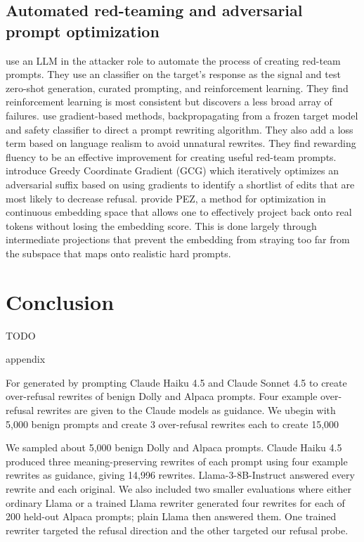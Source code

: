 \documentclass{article}
\begin{document}
\subsection{Automated red-teaming and adversarial prompt optimization}
  \citet{perez2022redteaming} use an LLM in the attacker role to automate the process of creating red-team prompts. They use an classifier on the target's response as the signal and test zero-shot generation, curated prompting, and reinforcement learning. They find reinforcement learning is most consistent but discovers a less broad array of failures. \citet{wichers2024gradient} use gradient-based methods, backpropagating from a frozen target model and safety classifier to direct a prompt rewriting algorithm. They also add a loss term based on language realism to avoid unnatural rewrites. They find rewarding fluency to be an effective improvement for creating useful red-team prompts. \citet{zou2023universal} introduce Greedy Coordinate Gradient (GCG) which iteratively optimizes an adversarial suffix based on using gradients to identify a shortlist of edits that are most likely to decrease refusal. \citet{wen2023hard} provide PEZ, a method for optimization in continuous embedding space that allows one to effectively project back onto real tokens without losing the embedding score. This is done largely through intermediate projections that prevent the embedding from straying too far from the subspace that maps onto realistic hard prompts.
  
\section{Conclusion}

TODO


appendix

For  generated by prompting Claude Haiku 4.5 and Claude Sonnet 4.5 to create over-refusal rewrites of benign Dolly and Alpaca prompts. Four example over-refusal rewrites are given to the Claude models as guidance. We ubegin with 5,000 benign prompts and create 3 over-refusal rewrites each to create 15,000


We sampled about 5,000 benign Dolly and Alpaca prompts. Claude Haiku 4.5 produced three meaning-preserving rewrites of each prompt using four example rewrites as guidance, giving 14,996 rewrites. Llama-3-8B-Instruct answered every rewrite and each original. We also included two smaller evaluations where either ordinary Llama or a trained Llama rewriter generated four rewrites for each of 200 held-out Alpaca prompts; plain Llama then answered them. One trained rewriter targeted the refusal direction and the other targeted our refusal probe.
\end{document}
